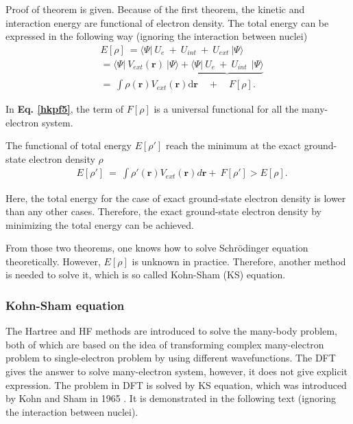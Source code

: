 \documentclass[a4paper, 12pt, titlepage,oneside,drop]{kthesis}
\begin{document}
Proof of theorem is given. Because of the first theorem, the kinetic and interaction energy are functional of electron density. The total energy can be expressed in the following way (ignoring the interaction between nuclei)
\begin{equation}\label{hkpf5}\begin{split}
& E[\rho] \ = \langle \Psi  | \ {U_e} \ + \ {U}_{int}  \ + \ {U}_{ext} \ | \Psi \rangle \\
&     = \langle \Psi  | \ {V}_{ext}(\textbf{r}) \ | \Psi \rangle  + \underbrace{\langle \Psi  | \ {U_e} \ + \ {U}_{int}  \ \ | \Psi \rangle}  \\
&     =   \ \int \rho(\textbf{r}) V_{ext}(\textbf{r}) \mathrm{d}\textbf{r} \quad +  \quad F[\rho]. 
\end{split}
\end{equation}

In \textbf{Eq. \ref{hkpf5}}, the term of $F[\rho]$ is a universal functional for all the many-electron system.

The functional of total energy $E[\rho']$ reach the minimum at the exact ground-state electron density $\rho$
\begin{equation}\begin{split}
 & E[\rho'] \ =   \ \int \rho'(\textbf{r}) V_{ext}(\textbf{r}) d \textbf{r}   + \  F[\rho'] > E[\rho]. 
\end{split}
\end{equation}
 
Here, the total energy for the case of exact ground-state electron density is lower than any other cases. Therefore, the exact ground-state electron density by minimizing the total energy can be achieved.

From those two theorems, one knows how to solve Schrödinger equation theoretically. However, $E[\rho]$ is unknown in practice. Therefore, another method is needed to solve it, which is so called Kohn-Sham (KS) equation.

\subsubsection{Kohn-Sham equation}

The Hartree and HF methods are introduced to solve the many-body problem, both of which are based on the idea of transforming complex 
many-electron problem to single-electron problem by using different wavefunctions. The DFT gives the answer to solve many-electron system, however, it does not give explicit expression.
The problem in DFT is solved by KS equation, which was introduced by Kohn and Sham in 1965 \cite{kohn1965self}. It is demonstrated in the following text (ignoring the interaction between nuclei).
\end{document}
